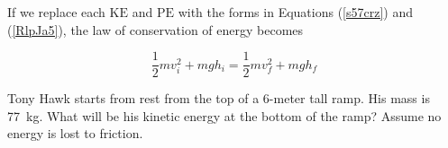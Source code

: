 \documentclass{article}
\numberwithin{equation}{section}
\numberwithin{figure}{section}
\begin{document}

If we replace each $\mathrm{KE}$ and $\mathrm{PE}$ with the forms in Equations (\ref{s57crz}) and (\ref{RlpJa5}), the law of conservation of energy becomes

\begin{equation} \label{ZSmSin}
    \frac{1}{2} m v_i^2 + mgh_i  = 
    \frac{1}{2} m v_f^2 + mgh_f 
\end{equation}








\begin{example} \label{mUfgIz}
Tony Hawk starts from rest from the top of a 6-meter tall ramp. His mass is \SI{77}{kg}. What will be his kinetic energy at the bottom of the ramp? Assume no energy is lost to friction.
\end{example}
\end{document}

